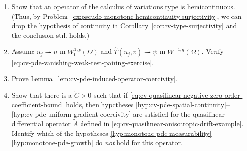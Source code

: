 \begin{enumerate}[label=\thesection.\arabic*.,ref=\thesection.\arabic*,start=16,series=book-problems]
\item\label{ex:cv-type-operator-hemicontinuity} Show that an operator of the calculus of variations type is hemicontinuous. (Thus, by Problem~\ref{ex:pseudo-monotone-hemicontinuity-surjectivity}, we can drop the hypothesis of continuity in Corollary~\ref{cor:cv-type-surjectivity} and the conclusion still holds.)

\item\label{ex:cv-pde-vanishing-weak-test-pairing} Assume $u_j\rightharpoonup\overline u$ in $W_0^{1,p}(\Omega)$ and $\widehat T(u_j,v)\rightharpoonup\psi$ in $W^{-1,q}(\Omega)$. Verify \eqref{eq:cv-pde-vanishing-weak-test-pairing-exercise}.

\item\label{ex:cv-pde-induced-operator-coercivity-proof} Prove Lemma~\ref{lem:cv-pde-induced-operator-coercivity}.

\item\label{ex:cv-pde-drift-example-hypotheses} Show that there is a $\widetilde C>0$ such that if \eqref{eq:cv-quasilinear-negative-zero-order-coefficient-bound} holds, then hypotheses \ref{hyp:cv-pde-spatial-continuity}--\ref{hyp:cv-pde-uniform-gradient-coercivity} are satisfied for the quasilinear differential operator $\widetilde A$ defined in \eqref{eq:cv-quasilinear-anisotropic-drift-example}. Identify which of the hypotheses \ref{hyp:monotone-pde-measurability}--\ref{hyp:monotone-pde-growth} do \emph{not} hold for this operator.

\end{enumerate}
